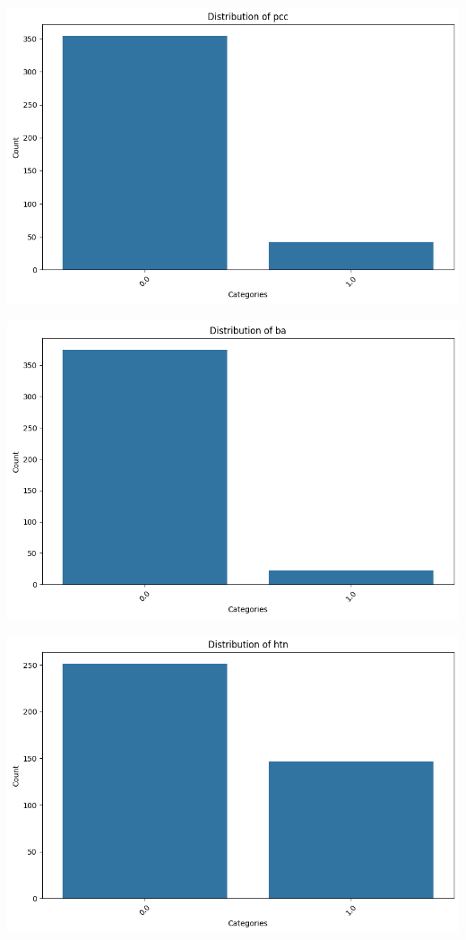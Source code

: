 \documentclass[
  11pt,
  letterpaper,
  DIV=11,
  numbers=noendperiod]{scrartcl}
\begin{document}
\includegraphics{Assignment6_Final version_files/figure-pdf/cell-15-output-3.png}

\includegraphics{Assignment6_Final version_files/figure-pdf/cell-15-output-4.png}

\includegraphics{Assignment6_Final version_files/figure-pdf/cell-15-output-5.png}
\end{document}
